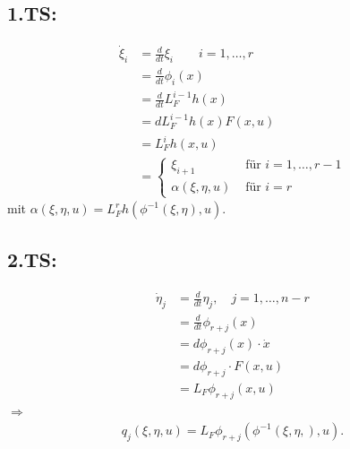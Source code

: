 \documentclass[ngerman]{tudscrreprt}
\begin{document}
\subsection*{1.TS: } \begin{align*}
\dot \xi_i &= \frac{d}{dt}\xi_i \qquad i =1,\dots, r\\ 
&= \frac{d}{dt} \phi_i(x)\\ 
&= \frac{d}{dt} L_F^{i-1}h(x)\\ 
&= dL_F^{i-1}h(x) F(x,u)\\ 
&= L_F^i h(x,u)\\ 
&= \left\{ \begin{matrix}\xi_{i+1} & \text{ für } i=1,\dots, r-1\\ 
\alpha(\xi, \eta, u) & \text{ für } i= r
 \end{matrix} \right.
\end{align*}
mit $\alpha(\xi, \eta, u) = L_F^r h(\phi^{-1}(\xi, \eta), u)$.
\subsection*{2.TS: } \begin{align*}
\dot \eta_j &= \frac{d}{dt}\eta_j ,\quad j=1,\dots, n-r\\ 
&= \frac{d}{dt}\phi_{r+j}(x)\\ 
&= d\phi_{r+j}(x)\cdot \dot x\\ 
&= d\phi_{r+j}\cdot F(x,u)\\ 
&= L_F \phi_{r+j}(x,u)
\end{align*}
$\Rightarrow$ \begin{align*} q_j(\xi, \eta, u) = L_F\phi_{r+j} (\phi^{-1}(\xi, \eta,),u). \end{align*}
\end{document}
